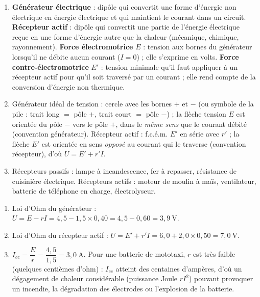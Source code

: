 \documentclass[11pt]{article}
\begin{document}
\begin{corrige}
\begin{enumerate}
\item \textbf{Générateur électrique} : dipôle qui convertit une forme d'énergie non électrique en énergie électrique et qui maintient le courant dans un circuit. \textbf{Récepteur actif} : dipôle qui convertit une partie de l'énergie électrique reçue en une forme d'énergie autre que la chaleur (mécanique, chimique, rayonnement). \textbf{Force électromotrice} $E$ : tension aux bornes du générateur lorsqu'il ne débite aucun courant ($I = 0$) ; elle s'exprime en volts. \textbf{Force contre-électromotrice} $E'$ : tension minimale qu'il faut appliquer à un récepteur actif pour qu'il soit traversé par un courant ; elle rend compte de la conversion d'énergie non thermique.
\item Générateur idéal de tension : cercle avec les bornes $+$ et $-$ (ou symbole de la pile : trait long $=$ pôle $+$, trait court $=$ pôle $-$) ; la flèche tension $E$ est orientée du pôle $-$ vers le pôle $+$, dans le \emph{même sens} que le courant débité (convention générateur). Récepteur actif : f.c.é.m. $E'$ en série avec $r'$ ; la flèche $E'$ est orientée en sens \emph{opposé} au courant qui le traverse (convention récepteur), d'où $U = E' + r'I$.
\item Récepteurs passifs : lampe à incandescence, fer à repasser, résistance de cuisinière électrique. Récepteurs actifs : moteur de moulin à maïs, ventilateur, batterie de téléphone en charge, électrolyseur.
\end{enumerate}
\end{corrige}

\begin{corrige}
\begin{enumerate}
\item Loi d'Ohm du générateur : $U = E - rI = 4,5 - 1,5 \times 0,40 = 4,5 - 0,60 = 3,9~\text{V}$.
\item Loi d'Ohm du récepteur actif : $U = E' + r'I = 6,0 + 2,0 \times 0,50 = 7,0~\text{V}$.
\item $I_{cc} = \dfrac{E}{r} = \dfrac{4,5}{1,5} = 3,0~\text{A}$. Pour une batterie de mototaxi, $r$ est très faible (quelques centièmes d'ohm) : $I_{cc}$ atteint des centaines d'ampères, d'où un dégagement de chaleur considérable (puissance Joule $rI^2$) pouvant provoquer un incendie, la dégradation des électrodes ou l'explosion de la batterie.
\end{enumerate}
\end{corrige}
\end{document}
